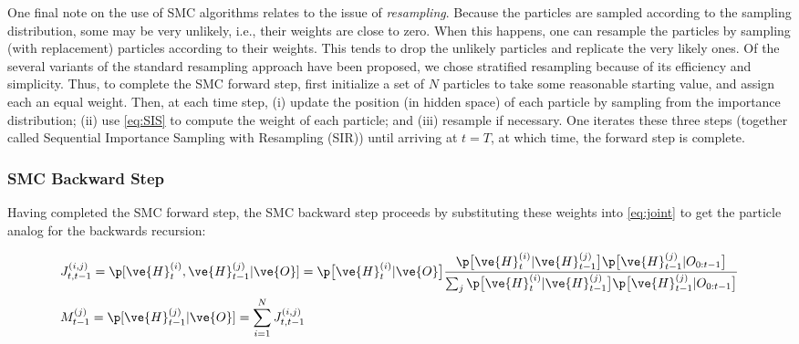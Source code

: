 One final note on the use of SMC algorithms relates to the issue of \emph{resampling}. Because the particles are sampled according to the sampling distribution, some may be very unlikely, i.e., their weights are close to zero. When this happens, one can resample the particles by sampling (with replacement) particles according to their weights.  This tends to drop the unlikely particles and replicate the very likely ones. Of the several variants of the standard resampling approach have been proposed\cite{Rubin87, GordonSmith93, Whitley94, Kitagawa96, LiuChen98,  Fearnhead98, CarpenterFearnhead99}, we chose stratified resampling because of its efficiency and simplicity\cite{DoucMoulines05}.  Thus, to complete the SMC forward step, first initialize a set of $N$ particles to take some reasonable starting value, and assign each an equal weight.  Then, at each time step, (i) update the position (in hidden space) of each particle by sampling from the importance distribution; (ii) use \eqref{eq:SIS} to compute the weight of each particle; and (iii) resample if necessary. One iterates these three steps (together called Sequential Importance Sampling with Resampling (SIR)\cite{DoucetAndrieu00}) until arriving at $t=T$, at which time, the forward step is complete.

\subsubsection{SMC Backward Step}

Having completed the SMC forward step, the SMC backward step proceeds by substituting these weights into \eqref{eq:joint} to get the particle analog for the backwards recursion:

\begin{subequations} \label{eq:part_back}
\begin{align} \label{eq:part_joint}
&J^{(i,j)}_{t,t-1} = \p[\ve{H}_t^{(i)}, \ve{H}_{t-1}^{(j)} | \ve{O}] %
=\p \big[\ve{H}^{(i)}_t | \ve{O}\big] \frac{
\p \big[\ve{H}^{(i)}_t | \ve{H}^{(j)}_{t-1} \big]
\p \big[\ve{H}^{(j)}_{t-1}  | O_{0:t-1}\big]}{\sum_j \p \big[\ve{H}^{(i)}_t | \ve{H}^{(j)}_{t-1} \big] \p \big[\ve{H}^{(j)}_{t-1}  | O_{0:t-1}\big]}
\\ \label{eq:part_marg} &M^{(j)}_{t-1} = \p[\ve{H}_{t-1}^{(j)} | \ve{O}]
= \sum_{i=1}^N J^{(i,j)}_{t,t-1}
\end{align}
\end{subequations}

